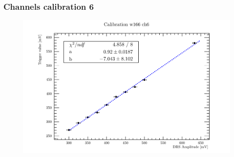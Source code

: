 
\begin{frame} [fragile]
\small
	\frametitle{Channels calibration 6}
    		\begin{figure}
		 \centering
			\includegraphics[scale=0.5]{figures/ch6.pdf}
		\end{figure}  
\end{frame}
